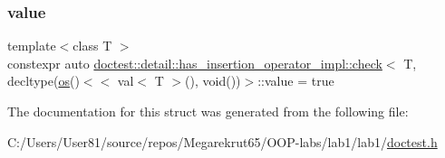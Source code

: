 \subsubsection{\texorpdfstring{value}{value}}
{\footnotesize\ttfamily template$<$class T $>$ \\
constexpr auto \mbox{\hyperlink{structdoctest_1_1detail_1_1has__insertion__operator__impl_1_1check}{doctest\+::detail\+::has\+\_\+insertion\+\_\+operator\+\_\+impl\+::check}}$<$ T, decltype(\mbox{\hyperlink{namespacedoctest_1_1detail_1_1has__insertion__operator__impl_a0f6ad916f976eb5821e2cddd91c3053d}{os}}()$<$$<$ val$<$ T $>$(), void())$>$\+::value = true\hspace{0.3cm}{\ttfamily [static]}}



The documentation for this struct was generated from the following file\+:\begin{DoxyCompactItemize}
\item 
C\+:/\+Users/\+User81/source/repos/\+Megarekrut65/\+O\+O\+P-\/labs/lab1/lab1/\mbox{\hyperlink{doctest_8h}{doctest.\+h}}\end{DoxyCompactItemize}
